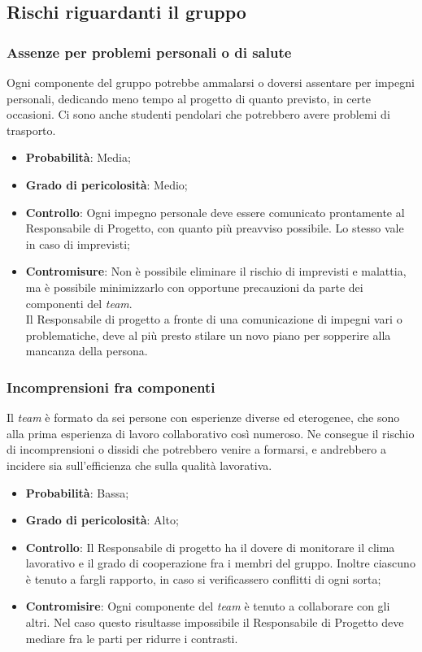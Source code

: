 \subsection{Rischi riguardanti il gruppo}

\subsubsection{Assenze per problemi personali o di salute}
\label{sec:Assenze}
Ogni componente del gruppo potrebbe ammalarsi o doversi assentare per impegni personali, dedicando meno tempo al progetto di quanto previsto, in certe occasioni. Ci sono anche studenti pendolari che potrebbero avere problemi di trasporto.
\begin{itemize}
\item \textbf{Probabilità}: Media;
\item \textbf{Grado di pericolosità}: Medio;
\item \textbf{Controllo}: Ogni impegno personale deve essere comunicato prontamente al Responsabile di Progetto, con quanto più preavviso possibile. Lo stesso vale in caso di imprevisti;
\item \textbf{Contromisure}: Non è possibile eliminare il rischio di imprevisti e malattia, ma è possibile minimizzarlo con opportune precauzioni da parte dei componenti del \textit{team}. \\
Il Responsabile di progetto a fronte di una comunicazione di impegni vari o problematiche, deve al più presto stilare un novo piano per sopperire alla mancanza della persona.
\end{itemize}

\subsubsection{Incomprensioni fra componenti}
\label{sec:Incomp}
Il \textit{team} è formato da sei persone con esperienze diverse ed eterogenee, che sono alla prima esperienza di lavoro collaborativo così numeroso. Ne consegue il rischio di incomprensioni o dissidi che potrebbero venire a formarsi, e andrebbero a incidere sia sull'efficienza che sulla qualità lavorativa.
\begin{itemize}
\item \textbf{Probabilità}: Bassa;
\item \textbf{Grado di pericolosità}: Alto;
\item \textbf{Controllo}: Il Responsabile di progetto ha il dovere di monitorare il clima lavorativo e il grado di cooperazione fra i membri del gruppo. Inoltre ciascuno è tenuto a fargli rapporto, in caso si verificassero conflitti di ogni sorta;
\item \textbf{Contromisire}: Ogni componente del \textit{team} è tenuto a collaborare con gli altri. Nel caso questo risultasse impossibile il Responsabile di Progetto deve mediare fra le parti per ridurre i contrasti.
\end{itemize}



